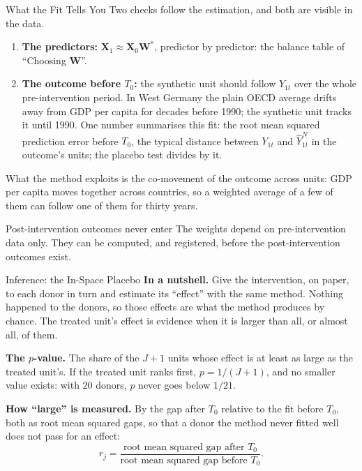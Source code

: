 \documentclass[main.tex]{subfiles}
\begin{document}
\begin{frame}{What the Fit Tells You}
  \small
  Two checks follow the estimation, and both are visible in the data.
  \begin{enumerate}\small
    \item \textbf{The predictors:} $\mathbf{X}_1 \approx \mathbf{X}_0
      \mathbf{W}^{*}$, predictor by predictor: the balance table of
      ``Choosing $\mathbf{W}$''.
    \item \textbf{The outcome before $T_0$:} the synthetic unit should follow
      $Y_{1t}$ over the whole pre-intervention period. In West Germany the
      plain OECD average drifts away from GDP per capita for decades before
      1990; the synthetic unit tracks it until 1990. One number summarises
      this fit: the root mean squared prediction error
      before $T_0$, the typical distance between $Y_{1t}$ and $\hat Y^{N}_{1t}$
      in the outcome's units; the placebo test divides by it.
  \end{enumerate}
  \medskip
  What the method exploits is the co-movement of the outcome across units:
  GDP per capita moves together across countries, so a weighted
  average of a few of them can follow one of them for thirty years.
  \medskip
  \begin{block}{\footnotesize Post-intervention outcomes never enter}
    \footnotesize The weights depend on pre-intervention data only. They can
    be computed, and registered, before the post-intervention outcomes exist.
  \end{block}
\end{frame}
\begin{frame}{Inference: the In-Space Placebo}
  \small
  \textbf{In a nutshell.} Give the intervention, on paper, to each donor in
  turn and estimate its ``effect'' with the same method. Nothing happened to
  the donors, so those effects are what the method produces by chance. The
  treated unit's effect is evidence when it is larger than all, or almost all,
  of them.
  \medskip

  \textbf{The $p$-value.} The share of the $J+1$ units whose effect is at least
  as large as the treated unit's. If the treated unit ranks first,
  $p = 1/(J+1)$, and no smaller value exists: with $20$ donors, $p$ never goes
  below $1/21$.
  \medskip

  \textbf{How ``large'' is measured.} By the gap after $T_0$ relative to the
  fit before $T_0$, both as root mean squared gaps, so that a donor the method
  never fitted well does not pass for an effect:
  \[
    r_j = \frac{\text{root mean squared gap after } T_0}
               {\text{root mean squared gap before } T_0}.
  \]
\end{frame}
\end{document}
